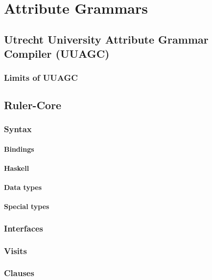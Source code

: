 \chapter{Attribute Grammars}

\section{Utrecht University Attribute Grammar Compiler (UUAGC)}

\subsection{Limits of UUAGC}


\section{Ruler-Core}

\subsection{Syntax}

\subsubsection{Bindings}

\subsubsection{Haskell}

\subsubsection{Data types}

\subsubsection{Special types}

\subsection{Interfaces}

\subsection{Visits}

\subsection{Clauses}

